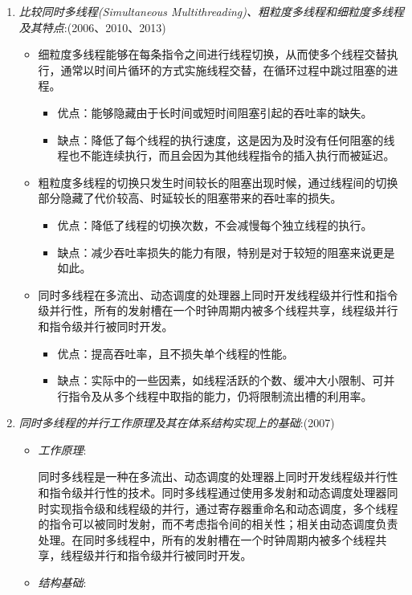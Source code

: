 \documentclass[a4paper]{ctexart}
\begin{document}
\begin{enumerate}
  \item \emph{比较同时多线程(Simultaneous Multithreading)、粗粒度多线程和细粒度多线程及其特点}:(2006、2010、2013)
  \begin{itemize}
    \item 细粒度多线程能够在每条指令之间进行线程切换，从而使多个线程交替执行，通常以时间片循环的方式实施线程交替，在循环过程中跳过阻塞的进程。
    \begin{itemize}
      \item 优点：能够隐藏由于长时间或短时间阻塞引起的吞吐率的缺失。
      \item 缺点：降低了每个线程的执行速度，这是因为及时没有任何阻塞的线程也不能连续执行，而且会因为其他线程指令的插入执行而被延迟。
    \end{itemize}
    \item 粗粒度多线程的切换只发生时间较长的阻塞出现时候，通过线程间的切换部分隐藏了代价较高、时延较长的阻塞带来的吞吐率的损失。
    \begin{itemize}
      \item 优点：降低了线程的切换次数，不会减慢每个独立线程的执行。
      \item 缺点：减少吞吐率损失的能力有限，特别是对于较短的阻塞来说更是如此。
    \end{itemize}
    \item 同时多线程在多流出、动态调度的处理器上同时开发线程级并行性和指令级并行性，所有的发射槽在一个时钟周期内被多个线程共享，线程级并行和指令级并行被同时开发。
    \begin{itemize}
      \item 优点：提高吞吐率，且不损失单个线程的性能。
      \item 缺点：实际中的一些因素，如线程活跃的个数、缓冲大小限制、可并行指令及从多个线程中取指的能力，仍将限制流出槽的利用率。
    \end{itemize}
  \end{itemize}
  
  \item \emph{同时多线程的并行工作原理及其在体系结构实现上的基础}:(2007)
  \begin{itemize}
    \item \emph{工作原理}:
    
    同时多线程是一种在多流出、动态调度的处理器上同时开发线程级并行性和指令级并行性的技术。同时多线程通过使用多发射和动态调度处理器同时实现指令级和线程级的并行，通过寄存器重命名和动态调度，多个线程的指令可以被同时发射，而不考虑指令间的相关性；相关由动态调度负责处理。在同时多线程中，所有的发射槽在一个时钟周期内被多个线程共享，线程级并行和指令级并行被同时开发。
    \item \emph{结构基础}:
    

\end{itemize}
\end{enumerate}
\end{document}
